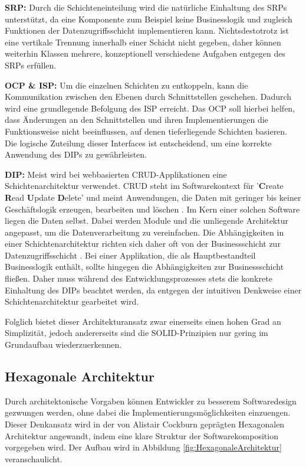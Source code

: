 \textbf{\acrlong{SRP}:} Durch die Schichteneinteilung wird die natürliche Einhaltung des \acrshort{SRP}s unterstützt, da eine Komponente zum Beispiel keine Businesslogik und zugleich Funktionen der Datenzugriffsschicht implementieren kann. Nichtsdestotrotz ist eine vertikale Trennung innerhalb einer Schicht nicht gegeben, daher können weiterhin Klassen mehrere, konzeptionell verschiedene Aufgaben entgegen des SRPs erfüllen. 

\textbf{\acrlong{OCP} \& \acrlong{ISP}:} Um die einzelnen Schichten zu entkoppeln, kann die Kommunikation zwischen den Ebenen durch Schnittstellen geschehen. Dadurch wird eine grundlegende Befolgung des \acrshort{ISP} erreicht. Das \acrlong{OCP} soll hierbei helfen, dass Änderungen an den Schnittstellen und ihren Implementierungen die Funktionsweise nicht beeinflussen, auf denen tieferliegende Schichten basieren. Die logische Zuteilung dieser Interfaces ist entscheidend, um eine korrekte Anwendung des \acrlong{DIP}s zu gewährleisten. 

\textbf{\acrlong{DIP}:} Meist wird bei webbasierten CRUD-Applikationen eine Schichtenarchitektur verwendet. \acrshort{CRUD} steht im Softwarekontext für '\textbf{C}reate \textbf{R}ead \textbf{U}pdate \textbf{D}elete' und meint Anwendungen, die Daten mit geringer bis keiner Geschäftslogik erzeugen, bearbeiten und löschen \cite[S. 381]{Martin.1980}. Im Kern einer solchen Software liegen die Daten selbst. Dabei werden Module und die umliegende Architektur angepasst, um die Datenverarbeitung zu vereinfachen. Die Abhängigkeiten in einer Schichtenarchitektur richten sich daher oft von der Businessschicht zur Datenzugriffsschicht \cite{Layered.SOLID}. Bei einer Applikation, die als Hauptbestandteil Businesslogik enthält, sollte hingegen die Abhängigkeiten zur Businessschicht fließen. Daher muss während des Entwicklungsprozesses stets die konkrete Einhaltung des DIPs beachtet werden, da entgegen der intuitiven Denkweise einer Schichtenarchitektur gearbeitet wird. 

Folglich bietet dieser Architekturansatz zwar einerseits einen hohen Grad an Simplizität, jedoch andererseits sind die SOLID-Prinzipien nur gering im Grundaufbau wiederzuerkennen. 

\pagebreak

\subsection{Hexagonale Architektur}

Durch architektonische Vorgaben können Entwickler zu besserem Softwaredesign gezwungen werden, ohne dabei die Implementierungsmöglichkeiten einzuengen. Dieser Denkansatz wird in der von Alistair Cockburn geprägten Hexagonalen Architektur angewandt, indem eine klare Struktur der Softwarekomposition vorgegeben wird. Der Aufbau wird in Abbildung \ref{fig:HexagonaleArchitektur} veranschaulicht. \\

